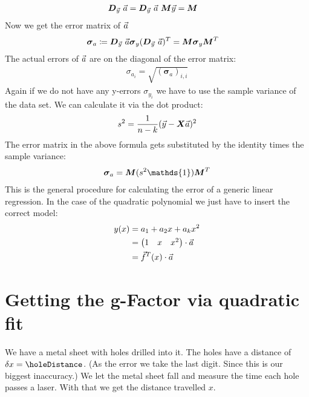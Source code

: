 \documentclass[11pt]{article}
\begin{document}
    \newcommand{\jacMatrix}{\boldsymbol{D}_{\yVec} \ \aVec}
    
    \begin{align*}
        \jacMatrix &= \jacMatrix \ \mMatrix \yVec = \mMatrix
    \end{align*}
    Now we get the error matrix of $\vec{a}$
    \newcommand{\eaMatrix}{\boldsymbol{\sigma}_{a}}
    \begin{align*}
        \eaMatrix &\coloneqq \jacMatrix \eMatrix (\jacMatrix)^T = \mMatrix \eMatrix \mMatrix^T
    \end{align*}
    The actual errors of $\vec{a}$ are on the diagonal of the error matrix:
    \begin{align*}
        \sigma_{a_i} = \sqrt {(\eaMatrix)_{i,i}}
    \end{align*}
    Again if we do not have any y-errors $\sigma_{y_i}$ we have to use the sample variance of the data set.
    We can calculate it via the dot product:
    \begin{align*}
        s^2 = \frac{1}{n - k} (\vec{y} - \boldsymbol{X} \vec{a})^2
    \end{align*}
    The error matrix in the above formula gets substituted by the identity times the sample variance:
    \begin{align*}
        \eaMatrix = \mMatrix (s^2 \mathds{1}) \mMatrix^T
    \end{align*}
    This is the general procedure for calculating the error of a generic linear regression. 
    In the case of the quadratic polynomial we just have to insert the correct model:
    \begin{align*}
        y(x) &= a_1 + a_2 x + a_k x^2 \\
        &= \begin{pmatrix}
               1 & x & x^2
        \end{pmatrix} \cdot \vec{a} \\
        &= \vec{f}^{T}(x) \cdot \vec{a}
    \end{align*}
    
    \section{Getting the g-Factor via quadratic fit}

    We have a metal sheet with holes drilled into it.
    The holes have a distance of $\delta x = \holeDistance$.
    (As the error we take the last digit.
    Since this is our biggest inaccuracy.)
    We let the metal sheet fall and measure the time each hole passes a laser.
    With that we get the distance travelled $x$.
    
\end{document}

